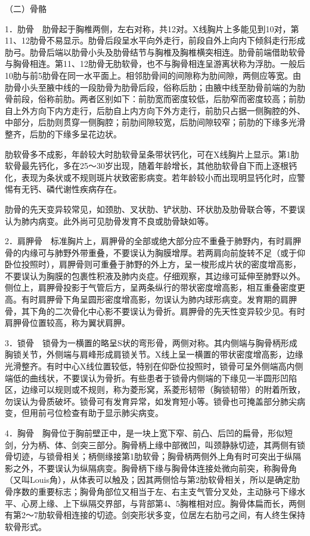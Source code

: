 （二）骨骼

1．肋骨　肋骨起于胸椎两侧，左右对称，共12对。X线胸片上多能见到10对，第11、12肋骨不易显示。肋骨后段呈水平向外走行，前段自外上向内下倾斜走行形成肋弓。肋骨后端以肋骨小头及肋骨结节与胸椎及胸椎横突相连。肋骨前端借助软骨与胸骨相连。第11、12肋骨无肋软骨，也不与胸骨相连呈游离状称为浮肋。一般后10肋与前5肋骨在同一水平面上。相邻肋骨间的间隙称为肋间隙，两侧应等宽。由肋骨小头至腋中线的一段肋骨为肋骨后段，俗称后肋；由腋中线至肋骨前端的为肋骨前段，俗称前肋。两者区别如下：前肋宽而密度较低，后肋窄而密度较高；前肋自上外方向下内方走行，后肋自上内方向下外方走行，前肋只占据一侧胸腔的外、中部分，后肋则贯穿一侧胸腔；前肋间隙较宽，后肋间隙较窄；前肋的下缘多光滑整齐，后肋的下缘多呈花边状。

肋软骨多不成影，年龄较大时肋软骨呈条带状钙化，可在X线胸片上显示。第1肋软骨最先钙化，多在25～30岁出现，随着年龄增长，其他肋软骨自下而上逐根钙化，表现为条状或不规则斑片状致密影病变。若年龄较小而出现明显钙化时，应警惕有无钙、磷代谢性疾病存在。

肋骨的先天变异较常见，如颈肋、叉状肋、铲状肋、环状肋及肋骨联合等，不要误认为肺内病变。此外尚可见肋骨发育不良或肋骨缺如等。

2．肩胛骨　标准胸片上，肩胛骨的全部或绝大部分应不重叠于肺野内，有时肩胛骨的内缘可与肺野外带重叠，不要误认为胸膜增厚。若两肩向前旋转不足（或于仰卧位投照时），肩胛骨则可重叠于肺野的外上方，呈一梭形成片状的密度增高影，不要误认为胸膜的包裹性积液及肺内炎症。仔细观察，其边缘可延伸至肺野以外。侧位上，肩胛骨投影于气管后方，呈两条纵行的带状密度增高影，相互重叠密度更高。有时肩胛骨下角呈圆形密度增高影，勿误认为肺内球形病变。发育期的肩胛骨，其下角的二次骨化中心影不要误认为骨折。肩胛骨的先天性变异较少见。有时肩胛骨位置较高，称为翼状肩胛。

3．锁骨　锁骨为一横置的略呈S状的弯形骨，两侧对称。其内侧端与胸骨柄形成胸锁关节，外侧端与肩峰形成肩锁关节。X线上呈一横置的带状密度增高影，边缘光滑整齐。有时中心X线位置较低，特别在仰卧位投照时，锁骨可呈外侧端高内侧端低的曲线状，不要误认为骨折。有些患者于锁骨内侧端的下缘见一半圆形凹陷区，边缘可以规则或不规则，称为菱形窝，系菱形韧带（胸锁韧带）的附着所致，勿误认为骨质破坏。锁骨可有发育异常，如发育短小等。锁骨也可掩盖部分肺尖病变，但用前弓位检查有助于显示肺尖病变。

4．胸骨　胸骨位于胸前壁正中，是一块上宽下窄、前凸、后凹的扁骨，形似短剑，分为柄、体、剑突三部分。胸骨柄上缘中部微凹，叫颈静脉切迹，其两侧有锁骨切迹，与锁骨相关；柄侧缘接第1肋软骨；胸骨柄两侧外上角有时可突出于纵隔影之外，不要误认为纵隔病变。胸骨柄下缘与胸骨体连接处微向前突，称胸骨角（又叫Louis角），从体表可以触及；因其两侧恰与第2肋软骨相关，所以是确定肋骨序数的重要标志；胸骨角部位又相当于左、右主支气管分叉处，主动脉弓下缘水平、心房上缘、上下纵隔交界部，与背部第4、5胸椎相对应。胸骨体扁而长，两侧有第2～7肋软骨相连接的切迹。剑突形状多变，位居左右肋弓之间，有人终生保持软骨形式。

